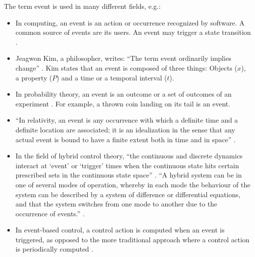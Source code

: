 \documentclass[10pt,final,a4paper,oneside,onecolumn]{article}
\begin{document}
The term event is used in many different fields, e.g.:
\begin{itemize}
	\item In computing, an event is an action or occurrence recognized by software. A common source of events are its users. An event may trigger a state transition \cite{breu1997towards}.
	\item Jeagwon Kim, a philosopher, writes: ``The term event ordinarily implies change'' \cite{kim1993supervenience}. Kim states that an event is composed of three things: Objects ($x$), a property ($P$) and a time or a temporal interval ($t$). 
	\item In probability theory, an event is an outcome or a set of outcomes of an experiment \cite{pfeiffer2013concepts}. For example, a thrown coin landing on its tail is an event.
	\item ``In relativity, an event is any occurrence with which a definite time and a definite location are associated; it is an idealization in the sense that any actual event is bound to have a finite extent both in time and in space'' \cite{sartori1996understanding}.
	\item In the field of hybrid control theory, ``the continuous and discrete dynamics interact at `event' or `trigger' times when the continuous state hits certain prescribed sets in the continuous state space'' \cite{branicky1998hybridcontrol}. ``A hybrid system can be in one of several modes of operation, whereby in each mode the behaviour of the system can be described by a system of difference or differential equations, and that the system switches from one mode to another due to the occurrence of events.'' \cite{deschutter2003hybrid}.
	\item In event-based control, a control action is computed when an event is triggered, as opposed to the more traditional approach where a control action is periodically computed \cite{heemels2012eventcontrol}. 
\end{itemize}
\end{document}
